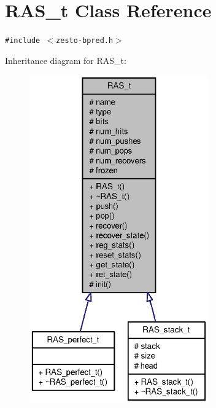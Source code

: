 \section{RAS\_\-t Class Reference}
\label{classRAS__t}
{\tt \#include $<$zesto-bpred.h$>$}

Inheritance diagram for RAS\_\-t:\nopagebreak
\begin{figure}[H]
\begin{center}
\leavevmode
\includegraphics[height=400pt]{classRAS__t__inherit__graph}
\end{center}
\end{figure}
